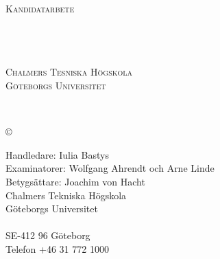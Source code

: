 \newpage
\thispagestyle{empty}
\begin{center}

    \textsc{\large Kandidatarbete \the\year{} }\\[4cm]

    \textbf{\Large \ambaTitle} \\[1cm]

    {\linespread{1.2}\large
    \StrSubstitute{\ambaAuthors}{,}{\\}
    \\ %
    }

    \vfill

    \ambaDepartmentSwedish{} \\
    \textsc{Chalmers Tesniska Högskola} \\
    \textsc{Göteborgs Universitet} \\
    \ambaCityCountryYearSwedish{}
\end{center}


\newpage
{\ambaTitle}\\
\textsc{\ambaAuthors}
\setlength{\parskip}{0.5cm}

\copyright{~\textsc{\ambaAuthors{} \the\year}}
\setlength{\parskip}{1cm}

Handledare: Iulia Bastys \\
Examinatorer: Wolfgang Ahrendt och Arne Linde \\
Betygsättare: Joachim von Hacht \\[1cm]

Chalmers Tekniska Högskola\\
Göteborgs Universitet\\
\ambaDepartmentSwedish{} \\
SE-412 96 Göteborg\\
Telefon +46 31 772 1000 \setlength{\parskip}{0.5cm}

\vfill
\ambaCityCountryYearSwedish{}
